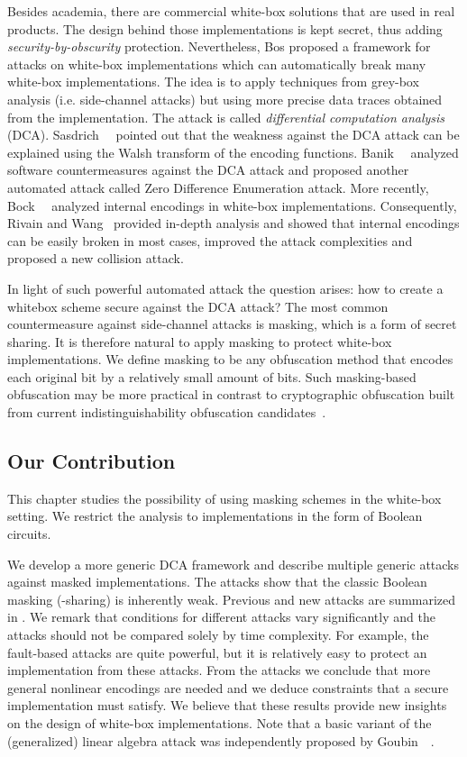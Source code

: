 Besides academia, there are commercial white-box solutions that are used in real products. The design behind those implementations is kept secret, thus adding \emph{security-by-obscurity} protection. Nevertheless, Bos \etal{} \cite{AttackBos} proposed a framework for attacks on white-box implementations which can automatically break many white-box implementations. The idea is to apply techniques from grey-box analysis (i.e. side-channel attacks) but using more precise data traces obtained from the implementation. The attack is called \emph{differential computation analysis} (DCA). Sasdrich~\etal{}~\cite{Sasdrich} pointed out that the weakness against the DCA attack can be explained using the Walsh transform of the encoding functions. Banik~\etal{}~\cite{Subhadeep} analyzed software countermeasures against the DCA attack and proposed another automated attack called Zero Difference Enumeration attack. More recently, Bock~\etal{}~\cite{InternalEncodings} analyzed internal encodings in white-box implementations. Consequently, Rivain and Wang~\cite{WangEncodings} provided in-depth analysis and showed that internal encodings can be easily broken in most cases, improved the attack complexities and proposed a new collision attack.

In light of such powerful automated attack the question arises: how to create a whitebox scheme secure against the DCA attack? The most common countermeasure against side-channel attacks is masking, which is a form of secret sharing. It is therefore natural to apply masking to protect white-box implementations. We define masking to be any obfuscation method that encodes each original bit by a relatively small amount of bits. Such masking-based obfuscation may be more practical in contrast to cryptographic obfuscation built from current indistinguishability obfuscation candidates~\cite{iOcand,5GEN}. 

\subsection{Our Contribution}

This chapter studies the possibility of using masking schemes in the white-box setting. We restrict the analysis to implementations in the form of Boolean circuits. 

We develop a more generic DCA framework and describe multiple generic attacks against masked implementations. The attacks show that the classic Boolean masking (\txor{}-sharing) is inherently weak. Previous and new attacks are summarized in . We remark that conditions for different attacks vary significantly and the attacks should not be compared solely by time complexity. For example, the fault-based attacks are quite powerful, but it is relatively easy to protect an implementation from these attacks. From the attacks we conclude that more general nonlinear encodings are needed and we deduce constraints that a secure implementation must satisfy. We believe that these results provide new insights on the design of white-box implementations. Note that a basic variant of the (generalized) linear algebra attack was independently proposed by Goubin~\etal{}~\cite{cryptoexperts}.

